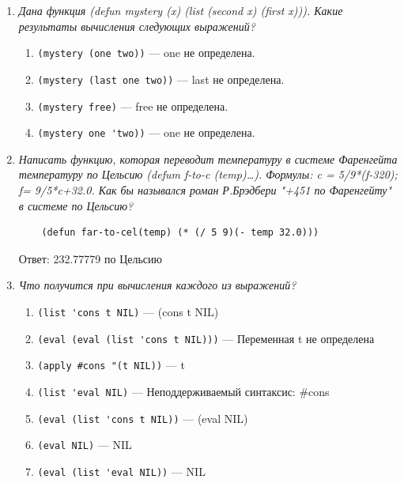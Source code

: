 \begin{enumerate}[wide=0pt]
\begin{enumerate}[label=\arabic*)]
	
\end{enumerate}

\item \textit{Дана функция (defun mystery (x) (list (second x) (first x))).
Какие результаты вычисления следующих выражений? }


\begin{enumerate}[label=\arabic*)]
	\item \lstinline {(mystery (one two))} --- one не определена.
	\item \lstinline {(mystery (last one two))} --- last не определена.
	\item \lstinline {(mystery free)} --- free не определена.
	\item \lstinline {(mystery one 'two))} --- one не определена.

	
\end{enumerate}

\item \textit{Написать функцию, которая переводит температуру в системе Фаренгейта
температуру по Цельсию (defum f-to-c (temp)…).
Формулы: 	c = 5/9*(f-320); 	f= 9/5*c+32.0. 
Как бы назывался роман Р.Брэдбери "+451 по Фаренгейту" в системе по Цельсию?}

\begin{lstlisting}
	(defun far-to-cel(temp) (* (/ 5 9)(- temp 32.0)))
\end{lstlisting}

Ответ: 232.77779 по Цельсию

\item \textit{Что получится при вычисления каждого из выражений?}


\begin{enumerate}[label=\arabic*)]
	\item \lstinline {(list 'cons t NIL)} --- (cons t NIL)
	\item \lstinline {(eval (eval (list 'cons t NIL)))} --- Переменная t не определена
	\item \lstinline {(apply #cons "(t NIL))} --- t
	\item \lstinline {(list 'eval NIL)} --- Неподдерживаемый синтаксис: \#cons
	\item \lstinline {(eval (list 'cons t NIL))} --- (eval NIL)
	\item \lstinline {(eval NIL)} --- NIL
	\item \lstinline {(eval (list 'eval NIL))} --- NIL

	
\end{enumerate}

\end{enumerate}